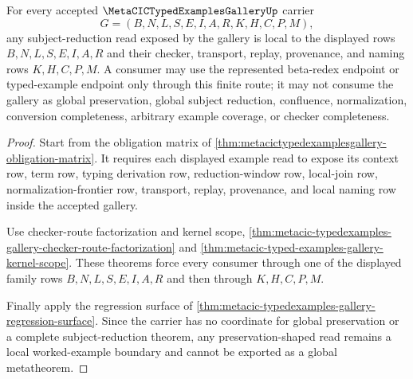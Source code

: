\begin{theorem}
\label{thm:metacic-typedexamples-gallery-local-subject-reduction-boundary}
For every accepted $\MetaCICTypedExamplesGalleryUp$ carrier
$$
G=(B,N,L,S,E,I,A,R,K,H,C,P,M),
$$
any subject-reduction read exposed by the gallery is local to the displayed rows $B,N,L,S,E,I,A,R$ and their checker, transport, replay, provenance, and naming rows $K,H,C,P,M$. A consumer may use the represented beta-redex endpoint or typed-example endpoint only through this finite route; it may not consume the gallery as global preservation, global subject reduction, confluence, normalization, conversion completeness, arbitrary example coverage, or checker completeness.
\end{theorem}
\begin{proof}
Start from the obligation matrix of \autoref{thm:metacictypedexamplesgallery-obligation-matrix}. It requires each displayed example read to expose its context row, term row, typing derivation row, reduction-window row, local-join row, normalization-frontier row, transport, replay, provenance, and local naming row inside the accepted gallery.

Use checker-route factorization and kernel scope, \autoref{thm:metacic-typedexamples-gallery-checker-route-factorization} and \autoref{thm:metacic-typed-examples-gallery-kernel-scope}. These theorems force every consumer through one of the displayed family rows $B,N,L,S,E,I,A,R$ and then through $K,H,C,P,M$.

Finally apply the regression surface of \autoref{thm:metacic-typedexamples-gallery-regression-surface}. Since the carrier has no coordinate for global preservation or a complete subject-reduction theorem, any preservation-shaped read remains a local worked-example boundary and cannot be exported as a global metatheorem.
\end{proof}

